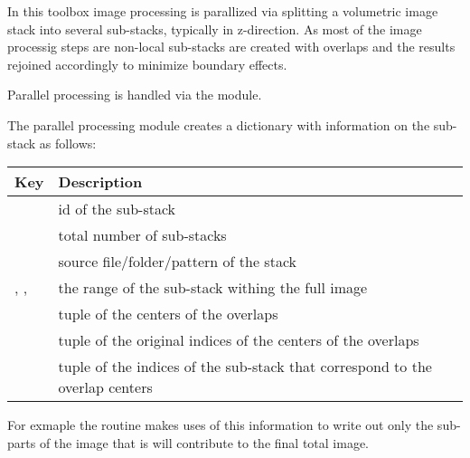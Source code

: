 \documentclass[letterpaper,10pt,english]{sphinxmanual}
\begin{document}
In this toolbox image processing is parallized via splitting a volumetric
image stack into several sub-stacks, typically in z-direction. As most of
the image processig steps are non-local sub-stacks are created with overlaps
and the results rejoined accordingly to minimize boundary effects.

Parallel processing is handled via the
{\hyperref[api/ClearMap.ImageProcessing:module-ClearMap.ImageProcessing.StackProcessing]{\emph{}}} module.

The parallel processing module creates a dictionary with information on
the sub-stack as follows:
\label{api/ClearMap.ImageProcessing:substack}
\begin{tabulary}{\linewidth}{|L|L|}
\hline
\textsf{\relax 
Key
} & \textsf{\relax 
Description
}\\
\hline
{}
 & 
id of the sub-stack
\\
\hline
{}
 & 
total number of sub-stacks
\\
\hline
{}
 & 
source file/folder/pattern of the stack
\\
\hline
{}, , 
 & 
the range of the sub-stack withing the full image
\\
\hline
{}
 & 
tuple of the centers of the overlaps
\\
\hline
{}
 & 
tuple of the original indices of the centers of
the overlaps
\\
\hline
{}
 & 
tuple of the indices of the sub-stack that
correspond to the overlap centers
\\
\hline\end{tabulary}


For exmaple the {\hyperref[api/ClearMap.ImageProcessing:ClearMap.ImageProcessing.StackProcessing.writeSubStack]{\emph{}}} routine makes uses of this information
to write out only the sub-parts of the image that is will contribute to the
final total image.
\end{document}
